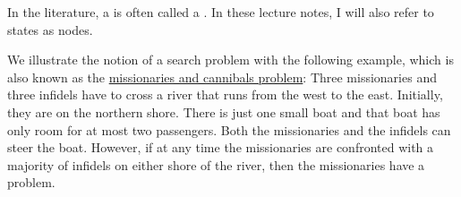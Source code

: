 \remark
In the literature, a  is often called a .  In these lecture
notes, I will also refer to states as nodes.  \eoxs

\example
We illustrate the notion of a search problem with the following example, which is also known as the 
\href{https://en.wikipedia.org/wiki/Missionaries_and_cannibals_problem}{missionaries and cannibals problem}: 
Three missionaries and three infidels have to cross a river that runs from the west to the east.
Initially, they are on the northern shore.  There is just one small boat and that boat has only room
for at most two passengers.  Both the missionaries and the infidels can steer the boat.  However, if
at any time the missionaries are confronted with a majority of infidels on either shore of the
river, then the missionaries have a problem.  

